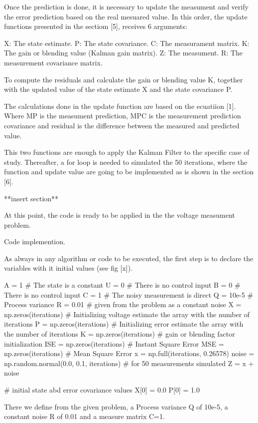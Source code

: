 \documentclass{article}
\begin{document}
Once the prediction is done, it is necessary to update the measument and verify the error prediction based on the real mesuared value.
In this order, the update functions presented in the sectiom [5], receives 6 arguments:

X: The state estimate.
P: The state covariance.
C: The measurament matrix.
K: The gain or blending value (Kalman gain matrix).
Z: The measument.
R: The measurement covariance matrix.

To compute the residuals and calculate the gain or blending value K, together with the updated value of the state estimate X and the
state covariance P. 

The calculations done in the update function are based on the ecuatiion [1]. Where MP is the measument prediction, MPC is the measurement
prediction covariance and residual is the difference between the measured and predicted value.

This two functions are enough to apply the Kalman Filter to the specific case of study. Thereafter, a for loop is needed to simulated the
50 iterations, where the function and update value are going to be implemented as is shown in the section [6].

**insert section**

At this point, the code is ready to be applied in the the voltage measument problem.

Code implemention.

As always in any algorithm or code  to be executed, the first step is to declare the variables with it initial values (see fig [x]).

A = 1 # The state is a constant
U = 0 # There is no control input
B = 0 # There is no control input
C = 1 # The noisy measurement is direct
Q = 10e-5 # Process variance
R = 0.01 # given from the problem as a constant noise
X = np.zeros(iterations) # Initializing voltage estimate the array with the number of iterations 
P = np.zeros(iterations) # Initializing error estimate the array with the number of iterations
K = np.zeros(iterations) # gain or blending factor initialization
ISE = np.zeros(iterations) # Instant Square Error
MSE = np.zeros(iterations) # Mean Square Error
x = np.full(iterations, 0.26578)
noise = np.random.normal(0.0, 0.1, iterations) # for 50 measurements simulated
Z = x + noise

# initial state abd error covariance values
X[0] = 0.0
P[0] = 1.0

There we define from the given problem, a Process variance Q of 10e-5, a constant noise R of 0.01 and a measure matrix C=1.
\end{document}
